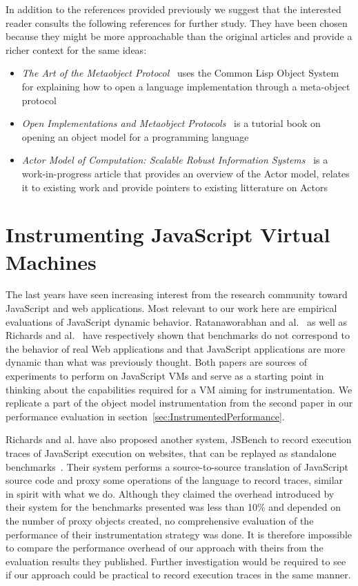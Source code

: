 In addition to the references provided previously we suggest that the
interested reader consults the following references for further study. They have
been chosen because they might be more approachable than the original articles
and provide a richer context for the same ideas:
\begin{itemize}
    \item \textit{The Art of the Metaobject Protocol}~\cite{Kiczales:1991} uses
        the Common Lisp Object System for explaining how to open a
        language implementation through a meta-object protocol
    \item \textit{Open Implementations and Metaobject
        Protocols}~\cite{Kickzales:1996} is a tutorial book on opening an object
        model for a programming language
    \item \textit{Actor Model of Computation: Scalable Robust Information
        Systems}~\cite{DBLP:journals/corr/abs-1008-1459} is a work-in-progress
        article that provides an overview of the Actor model, relates it to
        existing work and provide pointers to existing litterature on Actors 
\end{itemize}

\section{Instrumenting JavaScript Virtual Machines}
The last years have seen increasing interest from the research community toward
JavaScript and web applications. Most relevant to our work here are empirical
evaluations of JavaScript dynamic behavior. Ratanaworabhan and
al.~\cite{jsmeter} as well as Richards and al.~\cite{behavior_js} have
respectively shown that benchmarks do not correspond to the behavior of real
Web applications and that JavaScript applications are more dynamic than what
was previously thought. Both papers are sources of experiments to perform on
JavaScript VMs and serve as a starting point in thinking about the capabilities
required for a VM aiming for instrumentation. We replicate a part of the object
model instrumentation from the second paper in our performance evaluation in
section~\ref{sec:InstrumentedPerformance}.

Richards and al. have also proposed another system, JSBench to record execution
traces of JavaScript execution on websites, that can be replayed as standalone
benchmarks~\cite{Richards:2011}. Their system performs a source-to-source
translation of JavaScript source code and proxy some operations of the language
to record traces, similar in spirit with what we do. Although they claimed the
overhead introduced by their system for the benchmarks presented was less than
10\% and depended on the number of proxy objects created, no comprehensive
evaluation of the performance of their instrumentation strategy was done. It is
therefore impossible to compare the performance overhead of our approach with
theirs from the evaluation results they published. Further investigation would
be required to see if our approach could be practical to record execution
traces in the same manner.

